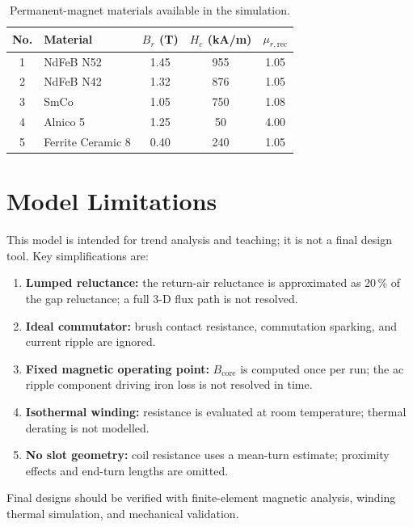 \documentclass[10pt, twocolumn, a4paper]{article}
\begin{document}
\begin{table}[H]
  \centering
  \caption{Permanent-magnet materials available in the simulation.}
  \label{tab:materials}
  \small
  \begin{tabular}{@{} c l c c c @{}}
    \toprule
    No. & Material & $B_r$ (T) & $H_c$ (kA/m) & $\mu_{r,\text{rec}}$ \\
    \midrule
    1 & NdFeB N52         & 1.45 &  955 & 1.05 \\
    2 & NdFeB N42         & 1.32 &  876 & 1.05 \\
    3 & SmCo              & 1.05 &  750 & 1.08 \\
    4 & Alnico 5          & 1.25 &   50 & 4.00 \\
    5 & Ferrite Ceramic 8 & 0.40 &  240 & 1.05 \\
    \bottomrule
  \end{tabular}
\end{table}

\section{Model Limitations}
\label{app:limits}

This model is intended for trend analysis and teaching; it is not a final
design tool. Key simplifications are:

\begin{enumerate}[leftmargin=2em, itemsep=1pt]
  \item \textbf{Lumped reluctance:} the return-air reluctance is
        approximated as 20\,\% of the gap reluctance; a full 3-D flux
        path is not resolved.
  \item \textbf{Ideal commutator:} brush contact resistance, commutation
        sparking, and current ripple are ignored.
  \item \textbf{Fixed magnetic operating point:} $B_\text{core}$ is
        computed once per run; the ac ripple component driving iron loss
        is not resolved in time.
  \item \textbf{Isothermal winding:} resistance is evaluated at room
        temperature; thermal derating is not modelled.
  \item \textbf{No slot geometry:} coil resistance uses a mean-turn
        estimate; proximity effects and end-turn lengths are omitted.
\end{enumerate}

Final designs should be verified with finite-element magnetic analysis,
winding thermal simulation, and mechanical validation.
\end{document}
